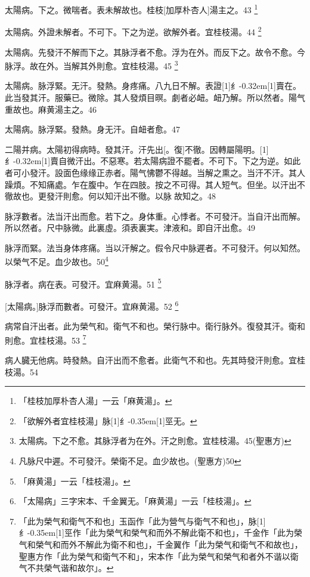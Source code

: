 \documentclass[oneside,b4paper]{ctexbook}
\begin{document}
\begin{flushleft}
太陽病。下之。微喘者。表未解故也。桂枝[加厚朴杏人]湯主之。43
\footnote{「桂枝加厚朴杏人湯」一云「麻黄湯」。}

太陽病。外證未解者。不可下。下之为逆。欲解外者。宜桂枝湯。44
\footnote{「欲解外者宜桂枝湯」脉{\hbox{\scalebox{0.68}[1]{纟}\kern-0.35em\scalebox{0.64}[1]{巠}}}无。}

太陽病。先發汗不解而下之。其脉浮者不愈。浮为在外。而反下之。故令不愈。今脉浮。故在外。当解其外則愈。宜桂枝湯。45
\footnote{太陽病。下之不愈。其脉浮者为在外。汗之則愈。宜桂枝湯。45(聖惠方)}

太陽病。脉浮緊。无汗。發熱。身疼痛。八九日不解。表證{\hbox{\scalebox{0.6}[1]{纟}\kern-0.32em\scalebox{0.7}[1]{賣}}}在。此当發其汗。服藥已。微除。其人發煩目暝。劇者必衄。衄乃解。所以然者。陽气重故也。麻黄湯主之。46

太陽病。脉浮緊。發熱。身无汗。自衄者愈。47

二陽并病。太陽初得病時。發其汗。汗先出[。復]不徹。因轉屬陽明。{\hbox{\scalebox{0.6}[1]{纟}\kern-0.32em\scalebox{0.7}[1]{賣}}}自微汗出。不惡寒。若太陽病證不罷者。不可下。下之为逆。如此者可小發汗。設面色缘缘正赤者。陽气怫鬱不得越。当解之熏之。当汗不汗。其人躁煩。不知痛處。乍在腹中。乍在四肢。按之不可得。其人短气。但坐。以汗出不徹故也。更發汗則愈。何以知汗出不徹。以脉{𬈧}故知之。48

脉浮數者。法当汗出而愈。若下之。身体重。心悸者。不可發汗。当自汗出而解。所以然者。尺中脉微。此裏虛。須表裏実。津液和。即自汗出愈。49

脉浮而緊。法当身体疼痛。当以汗解之。假令尺中脉遲者。不可發汗。何以知然。以榮气不足。血少故也。50\footnote{凡脉尺中遲。不可發汗。榮衛不足。血少故也。(聖惠方)50}

脉浮者。病在表。可發汗。宜麻黄湯。51
\footnote{「麻黄湯」一云「桂枝湯」。}

[太陽病。]脉浮而數者。可發汗。宜麻黄湯。52
\footnote{「太陽病」三字宋本、千金翼无。「麻黄湯」一云「桂枝湯」。}

病常自汗出者。此为榮气和。衛气不和也。榮行脉中。衛行脉外。復發其汗。衛和則愈。宜桂枝湯。53
\footnote{「此为榮气和衛气不和也」玉函作「此为營气与衛气不和也」，脉{\hbox{\scalebox{0.68}[1]{纟}\kern-0.35em\scalebox{0.64}[1]{巠}}}作「此为榮气和榮气和而外不解此衛不和也」，千金作「此为榮气和榮气和而外不解此为衛不和也」，千金翼作「此为榮气和衛气不和故也」，聖惠方作「此为榮气和衛气不和」，宋本作「此为榮气和榮气和者外不谐以衛气不共榮气谐和故尔」。}

病人臓无他病。時發熱。自汗出而不愈者。此衛气不和也。先其時發汗則愈。宜桂枝湯。54


\end{flushleft}
\end{document}
